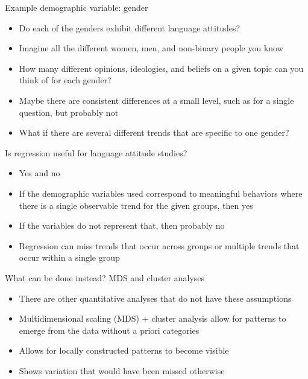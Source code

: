 \documentclass[10pt]{beamer}
\begin{document}
\begin{frame}{Example demographic variable: gender}
\begin{itemize}
\item Do each of the genders exhibit different language attitudes?
\item Imagine all the different women, men, and non-binary people you know
\item How many different opinions, ideologies, and beliefs on a given topic can you think of for each gender?
\item Maybe there are consistent differences at a small level, such as for a single question, but probably not
\item What if there are several different trends that are specific to one gender? 
\end{itemize}
\end{frame}



\begin{frame}{Is regression useful for language attitude studies?}
\begin{itemize}
\item  Yes and no
\item If the demographic variables used correspond to meaningful behaviors where there is a single observable trend for the given groups, then yes
\item If the variables do not represent that, then probably no
\item Regression can miss trends that occur across groups or multiple trends that occur within a single group
\end{itemize}
\end{frame}

\begin{frame}{What can be done instead? MDS and cluster analyses}
\begin{itemize}
\item There are other quantitative analyses that do not have these assumptions
\item Multidimensional scaling (MDS) $+$ cluster analysis allow for patterns to emerge from the data without a priori categories
\item Allows for locally constructed patterns to become visible
\item Shows variation that would have been missed otherwise
\end{itemize}
\end{frame}
\end{document}
